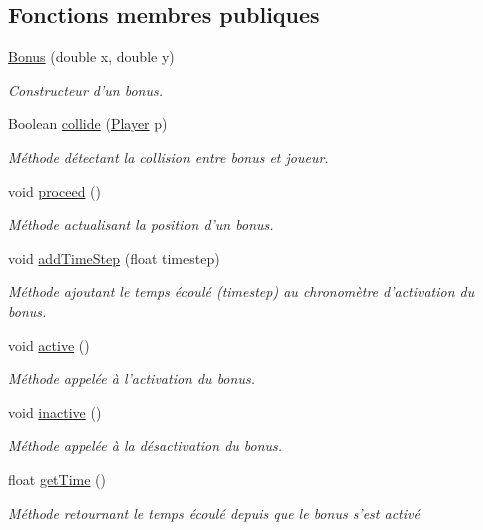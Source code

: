 \subsection*{Fonctions membres publiques}
\begin{DoxyCompactItemize}
\item 
\hyperlink{class_bonus_a1d1e2ebe69d7e1ac68e2550f80d2e632}{Bonus} (double x, double y)
\begin{DoxyCompactList}\small\item\em Constructeur d'un bonus. \end{DoxyCompactList}\item 
Boolean \hyperlink{class_bonus_a09f19db4fdca514ddb4b526c4ed4cc4f}{collide} (\hyperlink{class_player}{Player} p)
\begin{DoxyCompactList}\small\item\em Méthode détectant la collision entre bonus et joueur. \end{DoxyCompactList}\item 
void \hyperlink{class_bonus_a42e90885234abf53398e0c5d0b47cf0d}{proceed} ()
\begin{DoxyCompactList}\small\item\em Méthode actualisant la position d'un bonus. \end{DoxyCompactList}\item 
void \hyperlink{class_bonus_a3082cd3a33dee61d0d3d28727508f834}{add\-Time\-Step} (float timestep)
\begin{DoxyCompactList}\small\item\em Méthode ajoutant le temps écoulé (timestep) au chronomètre d'activation du bonus. \end{DoxyCompactList}\item 
void \hyperlink{class_bonus_ae3818b4a920609eecb9e0be60cd7afc9}{active} ()
\begin{DoxyCompactList}\small\item\em Méthode appelée à l'activation du bonus. \end{DoxyCompactList}\item 
void \hyperlink{class_bonus_a43bd71425625417a8c37e919510f90c3}{inactive} ()
\begin{DoxyCompactList}\small\item\em Méthode appelée à la désactivation du bonus. \end{DoxyCompactList}\item 
float \hyperlink{class_bonus_a2912fd692ce4fe1a7b34c4fa14c8fe9f}{get\-Time} ()
\begin{DoxyCompactList}\small\item\em Méthode retournant le temps écoulé depuis que le bonus s'est activé \end{DoxyCompactList}\end{DoxyCompactItemize}
